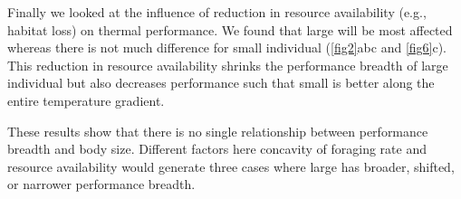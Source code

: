 Finally we looked at the influence of reduction in resource availability (e.g., habitat loss) on thermal performance.
We found that large will be most affected whereas there is not much difference for small individual (\cref{fig2}abc and \cref{fig6}c).
This reduction in resource availability shrinks the performance breadth of large individual but also decreases performance such that small is better along the entire temperature gradient.

These results show that there is no single relationship between performance breadth and body size. 
Different factors here concavity of foraging  rate and resource availability would generate three cases where large has broader, shifted, or narrower performance breadth.